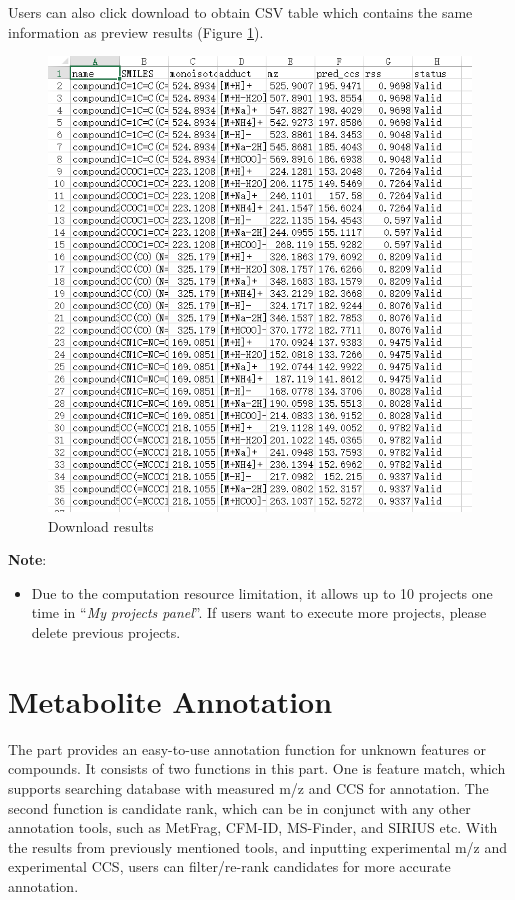 \documentclass[12pt,]{book}
\providecommand{\tightlist}{%
  \setlength{\itemsep}{0pt}\setlength{\parskip}{0pt}}
\begin{document}
Users can also click download to obtain CSV table which contains the
same information as preview results (Figure \ref{fig:figure3d4}).

\begin{figure}

{\centering \includegraphics{images/chapter3/figure3.4download_result} 

}

\caption{Download results}\label{fig:figure3d4}
\end{figure}

\textbf{Note}:

\begin{itemize}
\tightlist
\item
  Due to the computation resource limitation, it allows up to 10
  projects one time in ``\emph{My projects panel}''. If users want to
  execute more projects, please delete previous projects.
\end{itemize}

\chapter{Metabolite Annotation}\label{chapter4}

The part provides an easy-to-use annotation function for unknown
features or compounds. It consists of two functions in this part. One is
feature match, which supports searching database with measured m/z and
CCS for annotation. The second function is candidate rank, which can be
in conjunct with any other annotation tools, such as MetFrag, CFM-ID,
MS-Finder, and SIRIUS etc. With the results from previously mentioned
tools, and inputting experimental m/z and experimental CCS, users can
filter/re-rank candidates for more accurate annotation.
\end{document}
